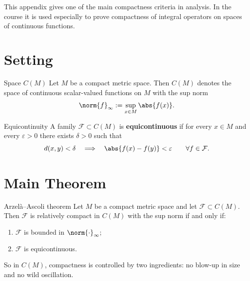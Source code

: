 \documentclass[11pt]{article}
\begin{document}

\vspace{0.8em}

\begin{focusbox}
This appendix gives one of the main compactness criteria in analysis. In the course it is used especially to prove compactness of integral operators on spaces of continuous functions.
\end{focusbox}

\tableofcontents

\section{Setting}

\begin{defbox}{Space $C(M)$}
Let $M$ be a compact metric space. Then $C(M)$ denotes the space of continuous scalar-valued functions on $M$ with the sup norm
\[
\norm{f}_{\infty}:=\sup_{x\in M}\abs{f(x)}.
\]
\end{defbox}

\begin{defbox}{Equicontinuity}
A family $\mathcal F\subset C(M)$ is \textbf{equicontinuous} if for every $x\in M$ and every $\varepsilon>0$ there exists $\delta>0$ such that
\[
d(x,y)<\delta
\quad\Longrightarrow\quad
\abs{f(x)-f(y)}<\varepsilon
\qquad \forall f\in\mathcal F.
\]
\end{defbox}

\section{Main Theorem}

\begin{thmbox}{Arzel\`a--Ascoli theorem}
Let $M$ be a compact metric space and let $\mathcal F\subset C(M)$. Then $\mathcal F$ is relatively compact in $C(M)$ with the sup norm if and only if:
\begin{enumerate}
\item $\mathcal F$ is bounded in $\norm{\cdot}_{\infty}$;
\item $\mathcal F$ is equicontinuous.
\end{enumerate}
\end{thmbox}

\begin{focusbox}
So in $C(M)$, compactness is controlled by two ingredients: no blow-up in size and no wild oscillation.
\end{focusbox}
\end{document}
